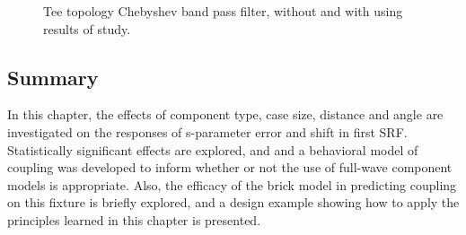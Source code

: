 \documentclass[12pt]{usfcoe}
\newcommand{\usfchapter}[1] 
{
    \pagebreak
    \vspace*{.72in}
    
        \addtocounter{section}{1} 
        \section*{\centering CHAPTER~\thesection: #1} 
        \addcontentsline{toc}{section}{CHAPTER~\thesection: #1} 
        \setcounter{subsection}{0} 
        \setcounter{subsubsection}{0}
}
\begin{document}
	\begin{figure}[H]
	    \centering
	    \quad
	    \caption{Tee topology Chebyshev band pass filter, without and with using results of study.}
	    \label{fig:better_layout} %
    \end{figure} 
    
    \subsection{Summary}
    In this chapter, the effects of component type, case size, distance and angle are investigated on the responses of s-parameter error and shift in first SRF.
    Statistically significant effects are explored, and and a behavioral model of coupling was developed to inform whether or not the use of full-wave component models is appropriate.
    Also, the efficacy of the brick model in predicting coupling on this fixture is briefly explored, and a design example showing how to apply the principles learned in this chapter is presented.


    
\end{document}
